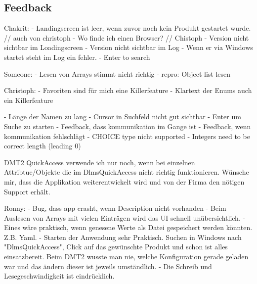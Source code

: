 \subsection{Feedback}
Chakrit: 
- Landingscreen ist leer, wenn zuvor noch kein Produkt gestartet wurde. // auch von christoph
   - Wo finde ich einen Browser? // Chistoph
- Version nicht sichtbar im Loadingscreen
- Version nicht sichtbar im Log
- Wenn er via Windows startet steht im Log ein fehler.
- Enter to search

Someone:
- Lesen von Arrays stimmt nicht richtig
   - repro: Object list lesen

Christoph:
- Favoriten sind für mich eine Killerfeature
- Klartext der Enums auch ein Killerfeature

- Länge der Namen zu lang
- Cursor in Suchfeld nicht gut sichtbar
- Enter um Suche zu starten
- Feedback, dass kommunikation im Gange ist
- Feedback, wenn kommunikation fehlschlägt
- CHOICE type nicht supported
- Integers need to be correct length (leading 0)

DMT2 QuickAccess verwende ich nur noch, wenn bei einzelnen Attribtue/Objekte die im DlmsQuickAccess nicht richtig funktionieren.
   Wünsche mir, dass die Applikation weiterentwickelt wird und von der Firma den nötigen Support erhält.



Ronny:
- Bug, dass app crasht, wenn Description nicht vorhanden
- Beim Auslesen von Arrays mit vielen Einträgen wird das UI schnell unübersichtlich.
- Eines wäre praktisch, wenn genesene Werte als Datei gespeichert werden könnten. Z.B. Yaml.
- Starten der Anwendung sehr Praktisch. Suchen in Windows nach "DlmsQuickAccess", Click auf das gewünschte Produkt und schon ist alles einsatzbereit.
Beim DMT2 wusste man nie, welche Konfiguration gerade geladen war und das ändern dieser ist jeweils umständlich.
- Die Schreib und Lesegeschwindigkeit ist eindrücklich.
